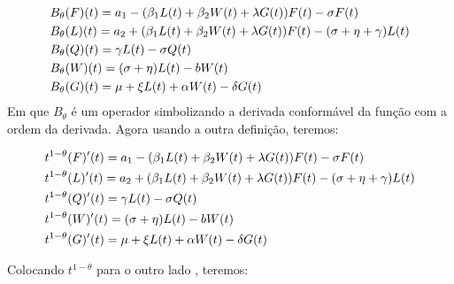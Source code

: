 \documentclass[12pt,a4paper]{article}
\begin{document}
    \begin{align}
    
    & B_\theta (F)(t) = a_1 - (\beta_1 L(t) + \beta_2 W(t) + \lambda G(t)) F(t) - \sigma F(t) \vspace{2mm} \\
    
    & B_\theta (L)(t) = a_2 + (\beta_1 L(t) + \beta_2 W(t) + \lambda G(t)) F(t) - (\sigma + \eta + \gamma) L(t)\vspace{2mm}\\
    
    & B_\theta (Q)(t) = \gamma L(t) - \sigma Q(t)\vspace{2mm}\\
    
    & B_\theta (W)(t) = (\sigma + \eta) L(t) - bW(t)\vspace{2mm}\\
    
    & B_\theta (G)(t) = \mu + \xi L(t) + \alpha W(t) - \delta G(t)
\end{align}
\noindent Em que $B_\theta$ é um operador simbolizando a derivada conformável da função com a ordem da derivada. Agora usando a outra definição, teremos:

    \begin{align}
    
    & t^{1-\theta} (F)'(t) = a_1 - (\beta_1 L(t) + \beta_2 W(t) + \lambda G(t)) F(t) - \sigma F(t) \vspace{2mm} \\
    
    & t^{1-\theta} (L)'(t) = a_2 + (\beta_1 L(t) + \beta_2 W(t) + \lambda G(t)) F(t) - (\sigma + \eta + \gamma) L(t)\vspace{2mm}\\
    
    & t^{1-\theta} (Q)'(t) = \gamma L(t) - \sigma Q(t)\vspace{2mm}\\
    
    & t^{1-\theta} (W)'(t) = (\sigma + \eta) L(t) - bW(t)\vspace{2mm}\\
    
    & t^{1-\theta} (G)'(t) = \mu + \xi L(t) + \alpha W(t) - \delta G(t)
\end{align}

\noindent Colocando $t^{1-\theta}$ para o outro lado , teremos:
\end{document}
